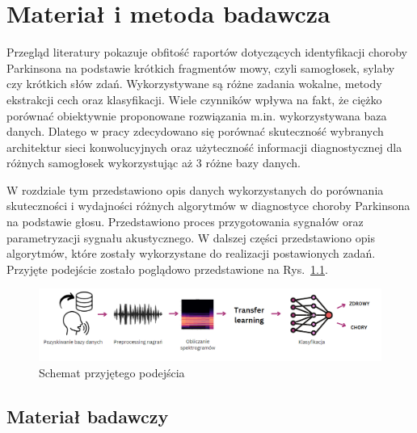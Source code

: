 \chapter{Materiał i metoda badawcza\@}
\label{ch:material-badawczy}

Przegląd literatury pokazuje obfitość raportów dotyczących identyfikacji choroby Parkinsona na podstawie krótkich fragmentów mowy, czyli samogłosek, sylaby czy krótkich słów zdań.
Wykorzystywane są różne zadania wokalne, metody ekstrakcji cech oraz klasyfikacji.
Wiele czynników wpływa na fakt, że ciężko porównać obiektywnie proponowane rozwiązania m.in.
wykorzystywana baza danych.
Dlatego w pracy zdecydowano się porównać skuteczność wybranych architektur sieci konwolucyjnych oraz użyteczność informacji diagnostycznej dla różnych samogłosek wykorzystując aż 3 różne bazy danych.

W rozdziale tym przedstawiono opis danych wykorzystanych do porównania skuteczności i wydajności różnych algorytmów w diagnostyce choroby Parkinsona na podstawie głosu.
Przedstawiono proces przygotowania sygnałów oraz parametryzacji sygnału akustycznego.
W dalszej części przedstawiono opis algorytmów, które zostały wykorzystane do realizacji postawionych zadań.
Przyjęte podejście zostało poglądowo przedstawione na Rys.~\ref{fig:methodology}.


\begin{figure}[htbp]
	\centering
	\includegraphics[width=1\textwidth]{./img/methodology}
	\caption{Schemat przyjętego podejścia\@}
    \label{fig:methodology}
\end{figure}


\section{Materiał badawczy}
\label{sec:material-badawczy}

